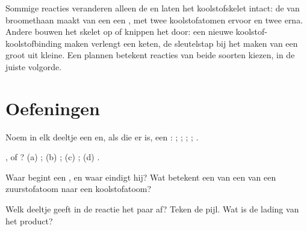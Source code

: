 \begin{remark}\label{rem:g12:curly-arrows:skeleton}
Sommige reacties veranderen alleen de  en laten het
koolstofskelet intact: de  van broomethaan maakt van een
 een , met twee koolstofatomen ervoor en twee erna.
Andere bouwen het skelet op of knippen het door: een nieuwe
koolstof-koolstofbinding maken verlengt een keten, de sleutelstap bij het
maken van een groot  uit kleine. Een  plannen betekent
reacties van beide soorten kiezen, in de juiste volgorde.
\end{remark}

\section{Oefeningen}

\begin{exercise}[$\star$]\label{exo:g12:curly-arrows:1}
Noem in elk deeltje een  en, als die er is, een
: ; ; ; ; .
\end{exercise}

\begin{exercise}[$\star$]\label{exo:g12:curly-arrows:2}
,  of ?
(a) ;
(b) ;
(c) ;
(d) .
\end{exercise}

\begin{exercise}[$\star$]\label{exo:g12:curly-arrows:3}
Waar begint een , en waar eindigt hij? Wat betekent een
 van een  van een zuurstofatoom naar een
koolstofatoom?
\end{exercise}

\begin{exercise}[$\star$]\label{exo:g12:curly-arrows:4}
Welk deeltje geeft in de reactie  het paar af?
Teken de pijl. Wat is de lading van het product?
\end{exercise}

